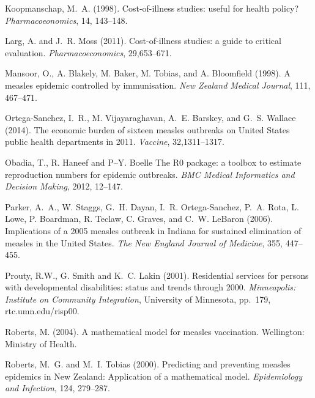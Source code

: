 \documentclass{article}
\begin{document}
\begin{itemize}
\begin{thebibliography}{}
Koopmanschap, M.~A. (1998).
\newblock Cost-of-illness studies: useful for health policy?
\newblock \emph{Pharmacoeonomics}, 14, 143--148.

Larg, A. and J.~R. Moss (2011).
\newblock Cost-of-illness studies: a guide to critical evaluation.
\newblock \emph{Pharmacoeconomics}, 29,653--671.

Mansoor, O., A. Blakely, M. Baker, M. Tobias, and A. Bloomfield (1998).
\newblock A measles epidemic controlled by immunisation. 
\newblock \emph{New Zealand Medical Journal}, 111, 467--471.

Ortega-Sanchez, I.~R., M. Vijayaraghavan, A.~E. Barskey, and G.~S. Wallace (2014).
\newblock The economic burden of sixteen measles outbreaks on United States public health departments in 2011.
\newblock \emph{Vaccine}, 32,1311--1317.

Obadia, T., R. Haneef and P--Y. Boelle
\newblock The R0 package: a toolbox to estimate reproduction numbers for epidemic outbreaks.
\newblock \emph{BMC Medical Informatics and Decision Making}, 2012, 12--147.

Parker, A.~A., W. Staggs, G.~H. Dayan, I.~R. Ortega-Sanchez, P.~A. Rota, L. Lowe, P. Boardman, R. Teclaw, C. Graves, and C.~W. LeBaron (2006).
\newblock Implications of a 2005 measles outbreak in Indiana for sustained elimination of measles in the United States.
\newblock \emph{The New England Journal of Medicine}, 355, 447--455.

Prouty, R.W., G. Smith and K.~C. Lakin (2001).
\newblock Residential services for persons with developmental disabilities: status and trends through 2000.
\newblock \emph{Minneapolis: Institute on Community Integration}, University of Minnesota, pp.~179, rtc.umn.edu/risp00.

Roberts, M. (2004).
\newblock A mathematical model for measles vaccination.
\newblock Wellington: Ministry of Health.

Roberts, M.~G. and M.~I. Tobias (2000).
\newblock Predicting and preventing measles epidemics in New Zealand: Application of a mathematical model. 
\newblock \emph{Epidemiology and Infection}, 124, 279--287.


\end{thebibliography}
\end{itemize}
\end{document}
